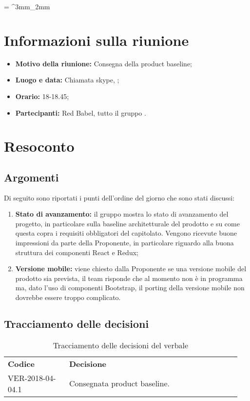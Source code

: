 \documentclass[VER-AAAA-MM-GG.tex]{subfiles}
\begin{document}
\tabulinesep = ^3mm_2mm
\chapter{Informazioni sulla riunione}
\begin{itemize}
	\item \textbf{Motivo della riunione:} Consegna della product baseline;
	\item \textbf{Luogo e data:} Chiamata skype, ;
	\item \textbf{Orario:} 18-18.45;
	\item \textbf{Partecipanti:} Red Babel, tutto il gruppo \gruppo.
\end{itemize}



\chapter{Resoconto}
\section{Argomenti}
Di seguito sono riportati i punti dell'ordine del giorno che sono stati discussi:
\begin{enumerate}
	\item \textbf{Stato di avanzamento:} il gruppo \gruppo mostra lo stato di avanzamento del progetto, in particolare sulla baseline architetturale del prodotto e su come questa copra i requisiti obbligatori del capitolato. Vengono ricevute buone impressioni da parte della Proponente, in particolare riguardo alla buona struttura dei componenti React e Redux;
	\item \textbf{Versione mobile:} viene chiesto dalla Proponente se una versione mobile del prodotto sia prevista, il team risponde che al momento non è in programma ma, dato l'uso di componenti Bootstrap, il porting della versione mobile non dovrebbe essere troppo complicato.
\end{enumerate}
\section{Tracciamento delle decisioni}
\begin{table}[H]
	\begin{center}
		\begin{tabu} to 
			\tableHeaderStyle
			\textbf{Codice} & \textbf{Decisione} \\
			VER-2018-04-04.1 & Consegnata product baseline. \\
		\end{tabu}
		\caption{Tracciamento delle decisioni del verbale}
	\end{center}
\end{table}
\end{document}
